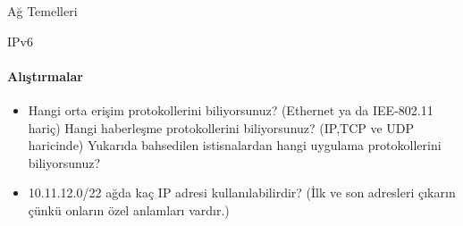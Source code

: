\begin{section}{Ağ Temelleri}
\begin{subsection}{IPv6}
\paragraph{Alıştırmalar}{
\begin{itemize}
 \item Hangi orta erişim protokollerini biliyorsunuz? (Ethernet ya da IEE-802.11 hariç) Hangi haberleşme protokollerini biliyorsunuz? (IP,TCP ve UDP haricinde) Yukarıda bahsedilen istisnalardan hangi uygulama protokollerini biliyorsunuz?
 \item 10.11.12.0/22 ağda kaç IP adresi kullanılabilirdir? (İlk ve son adresleri çıkarın çünkü onların özel anlamları vardır.)
\end{itemize}}
\end{subsection}
\end{section}


